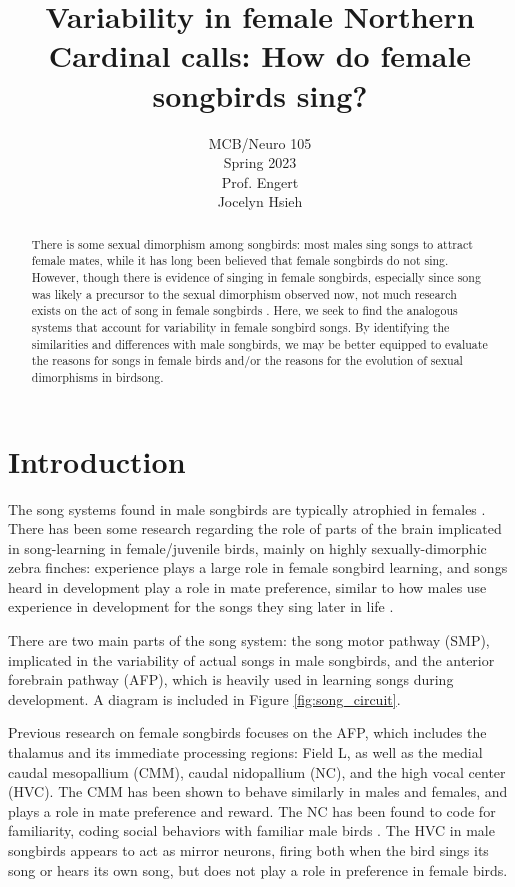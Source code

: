 \documentclass[12pt]{article}
\title{Variability in female Northern Cardinal calls: How do female songbirds sing? 
}
\author{MCB/Neuro 105\\Spring 2023\\Prof. Engert\\Jocelyn Hsieh}
\begin{document}
\maketitle

\begin{abstract}
    There is some sexual dimorphism among songbirds: most males sing songs to attract female mates, while it has long been believed that female songbirds do not sing. However, though there is evidence of singing in female songbirds, especially since song was likely a precursor to the sexual dimorphism observed now, not much research exists on the act of song in female songbirds \cite{Riebel}. Here, we seek to find the analogous systems that account for variability in female songbird songs. By identifying the similarities and differences with male songbirds, we may be better equipped to evaluate the reasons for songs in female birds and/or the reasons for the evolution of sexual dimorphisms in birdsong. 
\end{abstract}

\section{Introduction}
The song systems found in male songbirds are typically atrophied in females \cite{Mooney1}. There has been some research regarding the role of parts of the brain implicated in song-learning in female/juvenile birds, mainly on highly sexually-dimorphic zebra finches: experience plays a large role in female songbird learning, and songs heard in development play a role in mate preference, similar to how males use experience in development for the songs they sing later in life \cite{Fujii}. 

There are two main parts of the song system: the song motor pathway (SMP), implicated in the variability of actual songs in male songbirds, and the anterior forebrain pathway (AFP), which is heavily used in learning songs during development. A diagram is included in Figure \ref{fig:song_circuit}.

Previous research on female songbirds focuses on the AFP, which includes the thalamus and its immediate processing regions: Field L, as well as the medial caudal mesopallium (CMM), caudal nidopallium (NC), and the high vocal center (HVC). The CMM has been shown to behave similarly in males and females, and plays a role in mate preference and reward. The NC has been found to code for familiarity, coding social behaviors with familiar male birds \cite{Fujii}. The HVC in male songbirds appears to act as mirror neurons, firing both when the bird sings its song or hears its own song, but does not play a role in preference in female birds. 
\end{document}
